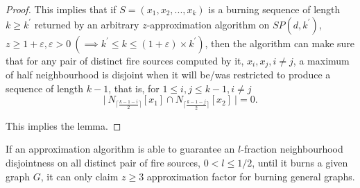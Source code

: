 \begin{proof}
This implies that if $S = (x_1, x_2, . . ., x_k)$ is a burning sequence of length $k \geq k^{\prime}$ returned by an arbitrary $z$-approximation algorithm on $SP(d,k^{\prime})$, $z \geq 1+\varepsilon, \varepsilon > 0\ (\implies k^{\prime} \leq k \leq (1 + \varepsilon) \times k^{\prime})$, then the algorithm can make sure that for any pair of distinct fire sources computed by it, $x_i, x_j, i \neq j$, a maximum of half neighbourhood is disjoint when it will be/was restricted to produce a sequence of length $k-1$, that is, for $1\leq i, j \leq k-1, i \neq j$\\
$$\Big |\ N_{\big\lceil\frac{k-1-i}{2} \big\rceil}[x_1] \cap N_{\big\lceil\frac{k-1-j}{2} \big\rceil}[x_2]\ \Big | = 0.$$

This implies the lemma.
\end{proof}

\begin{lemma}\label{lemma:3-approx-example}
    If an approximation algorithm is able to guarantee an $l$-fraction neighbourhood disjointness on all distinct pair of fire sources, $0 < l \leq 1/2$, until it burns a given graph $G$, it can only claim $z \geq 3$ approximation factor for burning general graphs.
\end{lemma}

